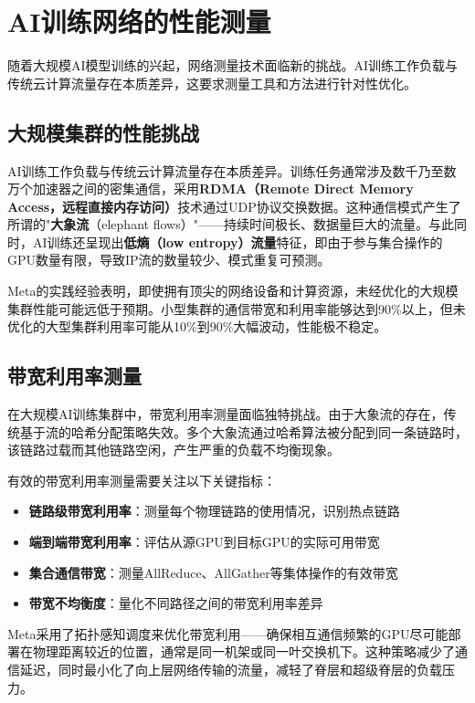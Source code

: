 

\section{AI训练网络的性能测量}

随着大规模AI模型训练的兴起，网络测量技术面临新的挑战。AI训练工作负载与传统云计算流量存在本质差异，这要求测量工具和方法进行针对性优化。

\subsection{大规模集群的性能挑战}

AI训练工作负载与传统云计算流量存在本质差异。训练任务通常涉及数千乃至数万个加速器之间的密集通信，采用\textbf{RDMA（Remote Direct Memory Access，远程直接内存访问）}技术通过UDP协议交换数据。这种通信模式产生了所谓的"\textbf{大象流}（elephant flows）"——持续时间极长、数据量巨大的流量。与此同时，AI训练还呈现出\textbf{低熵（low entropy）流量}特征，即由于参与集合操作的GPU数量有限，导致IP流的数量较少、模式重复可预测。

Meta的实践经验表明，即使拥有顶尖的网络设备和计算资源，未经优化的大规模集群性能可能远低于预期。小型集群的通信带宽和利用率能够达到90\%以上，但未优化的大型集群利用率可能从10\%到90\%大幅波动，性能极不稳定。

\subsection{带宽利用率测量}

在大规模AI训练集群中，带宽利用率测量面临独特挑战。由于大象流的存在，传统基于流的哈希分配策略失效。多个大象流通过哈希算法被分配到同一条链路时，该链路过载而其他链路空闲，产生严重的负载不均衡现象。

有效的带宽利用率测量需要关注以下关键指标：
\begin{itemize}
    \item \textbf{链路级带宽利用率}：测量每个物理链路的使用情况，识别热点链路
    \item \textbf{端到端带宽利用率}：评估从源GPU到目标GPU的实际可用带宽
    \item \textbf{集合通信带宽}：测量AllReduce、AllGather等集体操作的有效带宽
    \item \textbf{带宽不均衡度}：量化不同路径之间的带宽利用率差异
\end{itemize}

Meta采用了拓扑感知调度来优化带宽利用——确保相互通信频繁的GPU尽可能部署在物理距离较近的位置，通常是同一机架或同一叶交换机下。这种策略减少了通信延迟，同时最小化了向上层网络传输的流量，减轻了脊层和超级脊层的负载压力。

